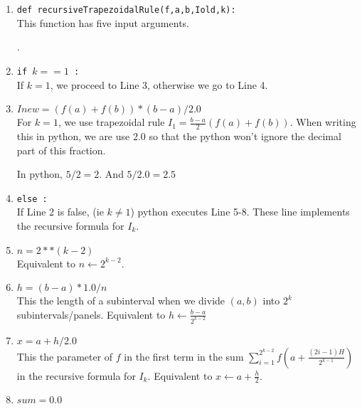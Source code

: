 \begin{commentary}
\begin{enumerate}[label=Line \arabic*]
	\item \texttt{def recursiveTrapezoidalRule(f,a,b,Iold,k):} \\
	This function has five input arguments.
.
	\item \texttt{if $k == 1$ :}\\
		If $k=1$, we proceed to Line 3, otherwise we go to Line 4.
	\item \texttt{$Inew = (f(a)+f(b))*(b-a)/2.0$}\\
		For $k=1$, we use trapezoidal rule $I_1 = \frac{b-a}{2}(f(a)+f(b))$.
		When writing this in python, we are use $2.0$ so that the python won't ignore the decimal part of this fraction.
	\begin{commentary}
		In python, $5/2 = 2$.
		And $5/2.0 = 2.5$
	\end{commentary}
	\item \texttt{else :}\\
		If Line 2 is false, (ie $k \ne 1$) python executes Line 5-8.
		These line implements the recursive formula for $I_k$.
	\item \texttt{$n = 2**(k-2)$}\\
		Equivalent to $n \leftarrow 2^{k-2}$.
	\item \texttt{$h = (b-a) * 1.0 / n$}\\
		This the length of a subinterval when we divide $(a,b)$ into $2^k$ subintervals/panels.
		Equivalent to $h \leftarrow \frac{b-a}{2^{k-2}}$
	\item \texttt{$x = a + h/2.0$}\\
		This the parameter of $f$ in the first term in the sum $\sum_{i=1}^{2^{k-2}} f\left(a+\frac{(2i-1)H}{2^{k-1}}\right)$ in the recursive formula for $I_k$.
		Equivalent to $x \leftarrow a+\frac{h}{2}$.
	\item \texttt{$sum = 0.0$}\\

\end{enumerate}
\end{commentary}
